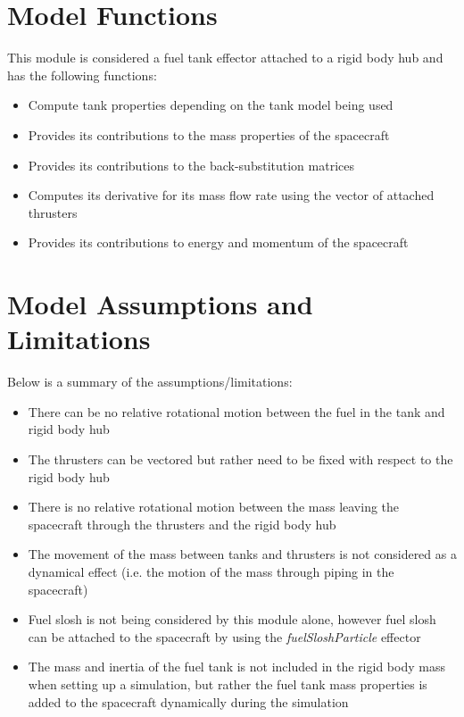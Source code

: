 \section{Model Functions}

This module is considered a fuel tank effector attached to a rigid body hub and has the following functions:

\begin{itemize}
	\item Compute tank properties depending on the tank model being used
	\item Provides its contributions to the mass properties of the spacecraft 
	\item Provides its contributions to the back-substitution matrices
	\item Computes its derivative for its mass flow rate using the vector of attached thrusters
	\item Provides its contributions to energy and momentum of the spacecraft
\end{itemize}

\section{Model Assumptions and Limitations}
Below is a summary of the assumptions/limitations:

\begin{itemize}
	\item There can be no relative rotational motion between the fuel in the tank and rigid body hub 
	\item The thrusters can be vectored but rather need to be fixed with respect to the rigid body hub
	\item There is no relative rotational motion between the mass leaving the spacecraft through the thrusters and the rigid body hub
	\item The movement of the mass between tanks and thrusters is not considered as a dynamical effect (i.e. the motion of the mass through piping in the spacecraft)
	\item Fuel slosh is not being considered by this module alone, however fuel slosh can be attached to the spacecraft by using the \textit{fuelSloshParticle} effector
	\item The mass and inertia of the fuel tank is not included in the rigid body mass when setting up a simulation, but rather the fuel tank mass properties is added to the spacecraft dynamically during the simulation
\end{itemize}